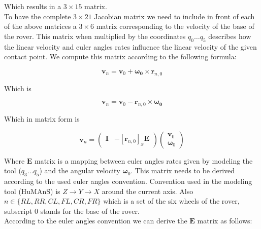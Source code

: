 \documentclass[a4paper]{article}
\begin{document}
\noindent Which results in a $3 \times 15$ matrix. \\

\noindent To have the complete $3 \times 21$ Jacobian matrix we need to include in front of each of the above matrices a $3 \times 6$ matrix corresponding to the velocity of the base of the rover.
This matrix when multiplied by the coordinates $q_{0} \ldots q_{5}$ describes how the linear velocity and euler angles rates influence the linear velocity of the given contact point. We compute this matrix according
to the following formula:

\begin{equation}
\boldsymbol{v}_{n} = \boldsymbol{v}_{0} + \boldsymbol{\omega_{0}} \times \boldsymbol{r}_{n, 0} 
\end{equation}

\noindent Which is 

\begin{equation}
\boldsymbol{v}_{n} = \boldsymbol{v}_{0} - \boldsymbol{r}_{n, 0} \times \boldsymbol{\omega_{0}}
\end{equation}

\noindent Which in matrix form is

\begin{equation}
\boldsymbol{v}_{n} = \begin{pmatrix} \boldsymbol{I} & - [\boldsymbol{r}_{n, 0}]_{x}\boldsymbol{E} \end{pmatrix} \begin{pmatrix} \boldsymbol{v}_{0} \\ \boldsymbol{\omega}_{0} \end{pmatrix} 
\end{equation}

\noindent Where $\boldsymbol{E}$ matrix is a mapping between euler angles rates given by modeling the tool ($q_{3} \ldots q_{5}$) and the angular velocity $\boldsymbol{\omega}_{0}$.
\noindent This matrix needs to be derived according to the used euler angles convention. Convention used in the modeling tool (HuMAnS) is $Z \to Y \to X$ around
the current axis. Also $n \in \{RL, RR, CL, FL, CR, FR\}$ which is a set of the six wheels of the rover, subscript $0$ stands for the base of the rover. \\

\noindent According to the euler angles convention we can derive the $\boldsymbol{E}$ matrix as follows:
\end{document}
